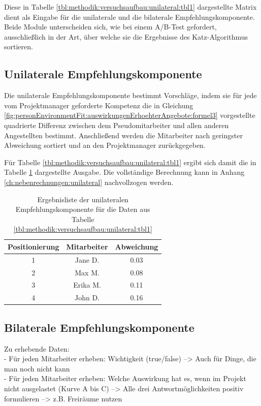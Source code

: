 Diese in Tabelle \ref{tbl:methodik:versuchsaufbau:unilateral:tbl1} dargestellte Matrix dient als Eingabe für die unilaterale und die bilaterale Empfehlungskomponente. Beide Module unterscheiden sich, wie bei einem A/B-Test gefordert, ausschließlich in der Art, über welche sie die Ergebnisse des Katz-Algorithmus sortieren.

\subsection{Unilaterale Empfehlungskomponente}
\label{ch:methodik:versuchsaufbau:unilateral}
Die unilaterale Empfehlungskomponente bestimmt Vorschläge, indem sie für jede vom Projektmanager geforderte Kompetenz die in Gleichung \ref{fig:personEnvironmentFit:auswirkungenErhoehterAngebote:formel3} vorgestellte quadrierte Differenz zwischen dem Pseudomitarbeiter und allen anderen Angestellten bestimmt. Anschließend werden die Mitarbeiter nach geringster Abweichung sortiert und an den Projektmanager zurückgegeben.

Für Tabelle \ref{tbl:methodik:versuchsaufbau:unilateral:tbl1} ergibt sich damit die in Tabelle \ref{tbl:methodik:versuchsaufbau:unilateral:tbl2} dargestellte Ausgabe. Die vollständige Berechnung kann in Anhang \ref{ch:nebenrechnungen:unilateral} nachvollzogen werden.

\begin{table}[h]
	\centering
	\begin{tabular}{c|c|c}
		Positionierung & Mitarbeiter & Abweichung\\
		\hline
		1 & Jane D.  & 0.03\\
		2 & Max M.   & 0.08\\
		3 & Erika M. & 0.11\\
		4 & John D.  & 0.16
	\end{tabular}
	\caption{Ergebnisliste der unilateralen Empfehlungskomponente für die Daten aus Tabelle \ref{tbl:methodik:versuchsaufbau:unilateral:tbl1}}
	\label{tbl:methodik:versuchsaufbau:unilateral:tbl2}
\end{table}

\subsection{Bilaterale Empfehlungskomponente}
\label{ch:methodik:versuchsaufbau:bilateral}

\newpage
Zu erhebende Daten:\\
- Für jeden Mitarbeiter erheben: Wichtigkeit (true/false) --> Auch für Dinge, die man noch nicht kann\\
- Für jeden Mitarbeiter erheben: Welche Auswirkung hat es, wenn im Projekt nicht ausgelastet (Kurve A bis C) --> Alle drei Antwortmöglichkeiten positiv formulieren --> z.B. Freiräume nutzen

